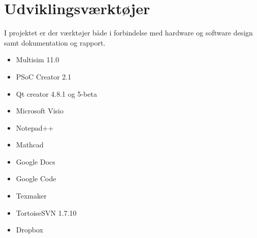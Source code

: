 \section{Udviklingsværktøjer}
I projektet er der værktøjer både i forbindelse med hardware og software design samt dokumentation og rapport.
\begin{itemize}
\item Multisim 11.0
\item PSoC Creator 2.1
\item Qt creator 4.8.1 og 5-beta
\item Microsoft Visio
\item Notepad++
\item Mathcad
\item Google Docs
\item Google Code
\item Texmaker
\item TortoiseSVN 1.7.10
\item Dropbox
\end{itemize}